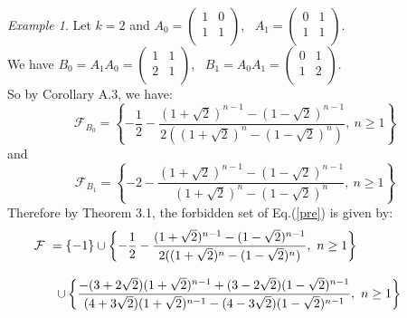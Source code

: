 \documentclass[11pt]{amsart}
\theoremstyle{definition}
\theoremstyle{remark}
\theoremstyle{example}
\newtheorem{exam}[thm]{Example}
\numberwithin{equation}{section}
\begin{document}
\begin{exam}\rm{
Let $k=2$ and $A_0=\left(
                 \begin{array}{cc}
                   1 & 0 \\
                  1 & 1 \\
                 \end{array}
               \right)$, \ $A_1=\left(
                 \begin{array}{cc}
                   0 & 1 \\
                  1 & 1 \\
                 \end{array}
 \right)$.\\
 We have $B_0=A_1A_0=\left(
                   \begin{array}{cc}
                     1 & 1\\
                     2 & 1 \\
                   \end{array}
                 \right)$, \ $B_1=A_0A_1=\left(
                                       \begin{array}{cc}
                                         0 & 1 \\
                                         1 & 2 \\
                                       \end{array}
                                     \right)$.\\
\noindent
 So by Corollary A.3, we have:
 $$\mathcal{F}_{B_0}=\left\{-\frac{1}{2}-\frac{(1+\sqrt{2})^{n-1}-(1-\sqrt{2})^{n-1}}{2((1+\sqrt{2})^n-(1-\sqrt{2})^n)}, \ n\geq1\right\}$$
 and
 $$\mathcal{F}_{B_1}=\left\{-2-\frac{(1+\sqrt{2})^{n-1}-(1-\sqrt{2})^{n-1}}{(1+\sqrt{2})^n-(1-\sqrt{2})^n}, \ n\geq1\right\}$$
 Therefore by Theorem 3.1, the forbidden set of Eq.(\ref{pre}) is given by:
 $$\begin{array}{ccc}
     \mathcal{F}\hspace{-0.4cm} & = \hspace{-0.7cm}& \displaystyle{ \left\{-1\right\}}\cup\left\{-\displaystyle{\frac{1}{2}}-\displaystyle{\frac{(1+\sqrt{2})^{n-1}-(1-\sqrt{2})^{n-1}}{2((1+\sqrt{2})^n-(1-\sqrt{2})^n)}}, \ n\geq1\right\} \hspace{2cm}\\
     \\
      &  & \cup\left\{\displaystyle{\frac{-(3+2\sqrt{2})(1+\sqrt{2})^{n-1}+(3-2\sqrt{2})(1-\sqrt{2})^{n-1}}{(4+3\sqrt{2})(1+\sqrt{2})^{n-1}-(4-3\sqrt{2})(1-\sqrt{2})^{n-1}}}, \ n\geq1\right\}\hspace{1cm}
   \end{array}$$}

 \end{exam}
\end{document}
